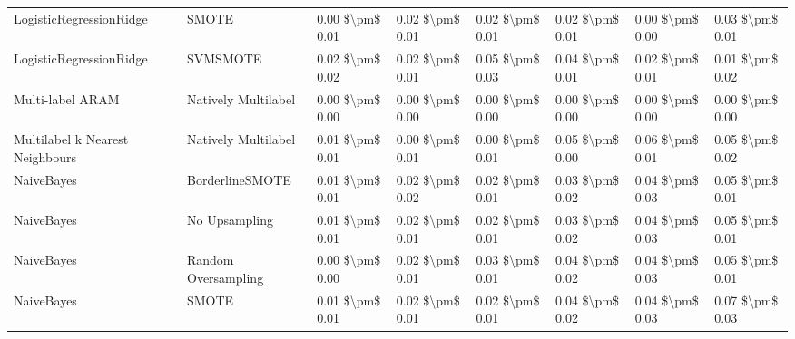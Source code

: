 \begin{tabular}{llllllll}
        LogisticRegressionRidge &                         SMOTE & 0.00 \$\textbackslash pm\$ 0.01 &           0.02 \$\textbackslash pm\$ 0.01 &       0.02 \$\textbackslash pm\$ 0.01 &        0.02 \$\textbackslash pm\$ 0.01 &                         0.00 \$\textbackslash pm\$ 0.00 &     0.03 \$\textbackslash pm\$ 0.01 \\
        LogisticRegressionRidge &                      SVMSMOTE & 0.02 \$\textbackslash pm\$ 0.02 &           0.02 \$\textbackslash pm\$ 0.01 &       0.05 \$\textbackslash pm\$ 0.03 &        0.04 \$\textbackslash pm\$ 0.01 &                         0.02 \$\textbackslash pm\$ 0.01 &     0.01 \$\textbackslash pm\$ 0.02 \\
               Multi-label ARAM &           Natively Multilabel & 0.00 \$\textbackslash pm\$ 0.00 &           0.00 \$\textbackslash pm\$ 0.00 &       0.00 \$\textbackslash pm\$ 0.00 &        0.00 \$\textbackslash pm\$ 0.00 &                         0.00 \$\textbackslash pm\$ 0.00 &     0.00 \$\textbackslash pm\$ 0.00 \\
Multilabel k Nearest Neighbours &           Natively Multilabel & 0.01 \$\textbackslash pm\$ 0.01 &           0.00 \$\textbackslash pm\$ 0.01 &       0.00 \$\textbackslash pm\$ 0.01 &        0.05 \$\textbackslash pm\$ 0.00 &                         0.06 \$\textbackslash pm\$ 0.01 &     0.05 \$\textbackslash pm\$ 0.02 \\
                     NaiveBayes &               BorderlineSMOTE & 0.01 \$\textbackslash pm\$ 0.01 &           0.02 \$\textbackslash pm\$ 0.02 &       0.02 \$\textbackslash pm\$ 0.01 &        0.03 \$\textbackslash pm\$ 0.02 &                         0.04 \$\textbackslash pm\$ 0.03 &     0.05 \$\textbackslash pm\$ 0.01 \\
                     NaiveBayes &                 No Upsampling & 0.01 \$\textbackslash pm\$ 0.01 &           0.02 \$\textbackslash pm\$ 0.01 &       0.02 \$\textbackslash pm\$ 0.01 &        0.03 \$\textbackslash pm\$ 0.02 &                         0.04 \$\textbackslash pm\$ 0.03 &     0.05 \$\textbackslash pm\$ 0.01 \\
                     NaiveBayes &           Random Oversampling & 0.00 \$\textbackslash pm\$ 0.00 &           0.02 \$\textbackslash pm\$ 0.01 &       0.03 \$\textbackslash pm\$ 0.01 &        0.04 \$\textbackslash pm\$ 0.02 &                         0.04 \$\textbackslash pm\$ 0.03 &     0.05 \$\textbackslash pm\$ 0.01 \\
                     NaiveBayes &                         SMOTE & 0.01 \$\textbackslash pm\$ 0.01 &           0.02 \$\textbackslash pm\$ 0.01 &       0.02 \$\textbackslash pm\$ 0.01 &        0.04 \$\textbackslash pm\$ 0.02 &                         0.04 \$\textbackslash pm\$ 0.03 &     0.07 \$\textbackslash pm\$ 0.03 \\

\end{tabular}
